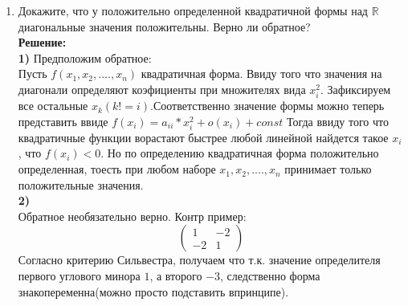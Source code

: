 \documentclass[]{book}
\theoremstyle{definition}
\newcommand{\bb}[1]{\mathbb{#1}}
\begin{document}
\begin{enumerate}[resume]
\item Докажите, что у положительно определенной квадратичной формы над $\bb{R}$ диагональные значения положительны. Верно ли обратное?\\
\textbf{Решение:}\\
\textbf{1)}
Предположим обратное:\\
Пусть $f(x_1,x_2,....,x_n)$ квадратичная форма.
Ввиду того что значения на диагонали определяют коэфициенты при множителях вида $x_i^2$. Зафиксируем все остальные $x_k(k!=i)$.Соответственно значение формы можно теперь представить ввиде $f(x_i)=a_{ii}*x_i^2+o(x_i)+const$  Тогда ввиду того что квадратичные функции ворастают быстрее любой линейной найдется такое $x_i$, что $f(x_i)<0$. Но по определению квадратичная форма положительно определенная, тоесть при любом наборе $x_1,x_2,....,x_n$ принимает только положительные значения.\\
\textbf{2)}\\
Обратное необязательно верно. Контр пример:
\begin{equation*}
\begin{pmatrix}
1&-2\\
-2&1
\end{pmatrix}
\end{equation*}
Согласно критерию Сильвестра, получаем что т.к. значение определителя первого углового минора $1$, а второго $-3$, следственно форма знакопеременна(можно просто подставить впринципе).



\end{enumerate}
\end{document}
